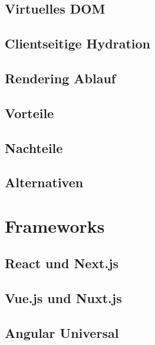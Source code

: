 \documentclass[runningheads]{llncs}
\begin{document}
\subsection{Virtuelles DOM}
\label{subsec:Virtuelles DOM}

\subsection{Clientseitige Hydration}
\label{subsec:Clientseitige Hydration}

\subsection{Rendering Ablauf}
\label{subsec:Rendering Ablauf}

\subsection{Vorteile}
\label{subsec:Vorteile}

\subsection{Nachteile}
\label{subsec:Nachteile}

\subsection{Alternativen}
\label{subsec:Alternativen}

\section{Frameworks}
\label{sec:Evaluation}

\subsection{React und Next.js}
\label{subsec:React und Next.js}

\subsection{Vue.js und Nuxt.js}
\label{subsec:Vue.js und Nuxt.js}

\subsection{Angular Universal}
\label{subsec:Angular Universal}
\end{document}
